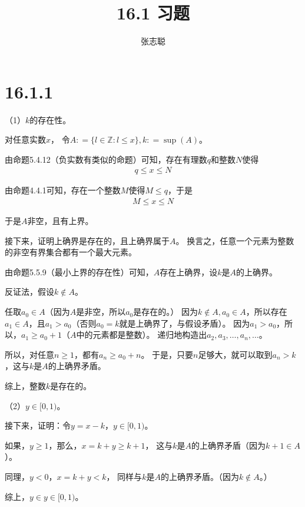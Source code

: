 \documentclass{article}
\begin{document}
\title{16.1 习题}
\author{张志聪}
\maketitle

\section*{16.1.1}

（1）$k$的存在性。

对任意实数$x$，
令$A : = \{l \in \mathbb{Z}: l \leq x\}, k: = \sup(A)$。

由命题5.4.12（负实数有类似的命题）可知，存在有理数$q$和整数$N$使得
\begin{align*}
  q \leq x \leq N
\end{align*}

由命题4.4.1可知，存在一个整数$M$使得$M \leq q$，于是
\begin{align*}
  M \leq x \leq N
\end{align*}

于是$A$非空，且有上界。

接下来，证明上确界是存在的，且上确界属于$A$。
换言之，任意一个元素为整数的非空有界集合都有一个最大元素。

由命题5.5.9（最小上界的存在性）可知，$A$存在上确界，设$k$是$A$的上确界。

反证法，假设$k \notin A$。

任取$a_0 \in A$（因为$A$是非空，所以$a_0$是存在的。）
因为$k \notin A, a_0 \in A$，所以存在$a_1 \in A$，且$a_1 > a_0$（否则$a_0 = k$就是上确界了，与假设矛盾）。
因为$a_1 > a_0$，所以，$a_1 \geq a_0 + 1$（$A$中的元素都是整数）。
递归地构造出$a_2, a_3, \dots, a_n, \dots$。

所以，对任意$n \geq 1$，都有$a_n \geq a_0 + n$。
于是，只要$n$足够大，就可以取到$a_n > k$，这与$k$是$A$的上确界矛盾。

综上，整数$k$是存在的。

（2）$y \in [0, 1)$。

接下来，证明：令$y = x - k$，$y \in [0, 1)$。

如果，$y \geq 1$，那么，$x = k + y \geq k + 1$，
这与$k$是$A$的上确界矛盾（因为$k + 1 \in A$）。

同理，$y < 0$，$x = k + y < k$，
同样与$k$是$A$的上确界矛盾。（因为$k \notin A$。）

综上，$y \in y \in [0, 1)$。
\end{document}
